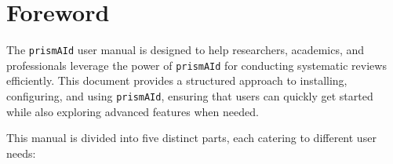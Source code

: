 \chapter*{Foreword}

The \texttt{prismAId} user manual is designed to help researchers, academics, and professionals leverage the power of \texttt{prismAId} for conducting systematic reviews efficiently. This document provides a structured approach to installing, configuring, and using \texttt{prismAId}, ensuring that users can quickly get started while also exploring advanced features when needed.

This manual is divided into five distinct parts, each catering to different user needs:

